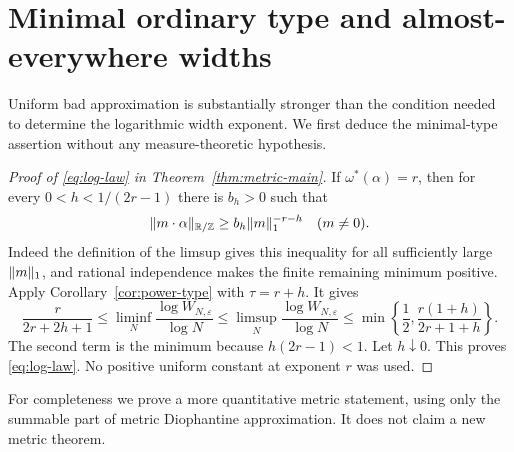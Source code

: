 \section{Minimal ordinary type and almost-everywhere widths}\label{sec:metric}
Uniform bad approximation is substantially stronger than the condition needed to determine the logarithmic width exponent. We first deduce the minimal-type assertion without any measure-theoretic hypothesis.

\begin{proof}[Proof of \eqref{eq:log-law} in Theorem~\ref{thm:metric-main}]
If $\omega^*(\alpha)=r$, then for every $0<h<1/(2r-1)$ there is $b_h>0$ such that
\[
 \lVert m\cdot\alpha\rVert_{\mathbb R/\mathbb Z}\ge b_h\lVert m\rVert_1^{-r-h}
                          \quad(m\ne0).
\]
Indeed the definition of the limsup gives this inequality for all sufficiently large $\lVert m\rVert_1$, and rational independence makes the finite remaining minimum positive. Apply Corollary~\ref{cor:power-type} with $\tau=r+h$. It gives
\[
 \frac{r}{2r+2h+1}\le
 \liminf_N\frac{\log W_{N,\varepsilon}}{\log N}
 \le\limsup_N\frac{\log W_{N,\varepsilon}}{\log N}
 \le\min\left\{\frac12,\frac{r(1+h)}{2r+1+h}\right\}.
\]
The second term is the minimum because $h(2r-1)<1$. Let $h\downarrow0$. This proves \eqref{eq:log-law}. No positive uniform constant at exponent $r$ was used.
\end{proof}

For completeness we prove a more quantitative metric statement, using only the summable part of metric Diophantine approximation. It does not claim a new metric theorem.

